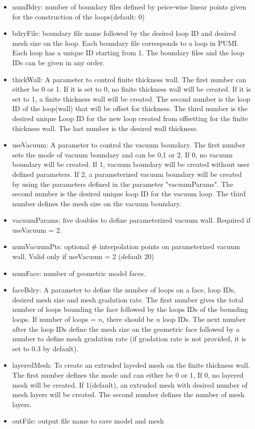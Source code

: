 \begin{itemize}
\item numBdry: number of boundary files defined by peice-wise linear points given for the construction of the loops(default: 0)
\item bdryFile: boundary file name followed by the desired loop ID and desired mesh size on the loop. Each boundary file corresponds to a loop in PUMI. Each loop has a unique ID starting from 1. The boundary files and the loop IDs can be given in any order.
\item thickWall: A parameter to control finite thickness wall. The first number can either be 0 or 1. If it is set to 0, no finite thickness wall will be created. If it is set to 1, a finite thickness wall will be created. The second number is the loop ID of the loop(wall) that will be offset for thickness. The third number is the desired unique Loop ID for the new loop created from offsetting  for the finite thickness wall. The last number is the desired wall thickness. 
\item useVacuum: A parameter to control the vacuum boundary. The first number sets the mode of vacuum boundary and can be 0,1 or 2. If 0, no vacuum boundary will be created. If 1, vacuum boundary will be created without user defined parameters. If 2, a parameterized vacuum boundary will be created by using the parameters defined in the parameter "vacuumParams". The second number is the desired unique loop ID for the vacuum loop. The third number defines the mesh size on the vacuum boundary.
\item vacuumParams: five doubles to define parameterized vacuum wall. Required if useVacuum = 2.
\item numVacuumPts: optional \# interpolation points on parameterized vacuum wall. Valid only if useVacuum = 2 (default 20)
\item numFace: number of geometric model faces.
\item faceBdry: A parameter to define the number of loops on a face, loop IDs, desired mesh size and mesh gradation rate. The first number gives the total number of loops bounding the face followed by the loops IDs of the bounding loops. If number of loops = $n$, there should be $n$ loop IDs. The next number after the loop IDs define the mesh size on the geometric face followed by a number to define mesh gradation rate (if gradation rate is not provided, it is set to 0.3 by default). 
\item layeredMesh: To create an extruded layeded mesh on the finite thickness wall. The first  number defines the mode and can either be 0 or 1, If 0, no layered mesh will be created. If 1(default), an extruded mesh with desired number of mesh layers will be created. The second number defines the number of mesh layers.
\item outFile: output file name to save model and mesh
\end{itemize}

